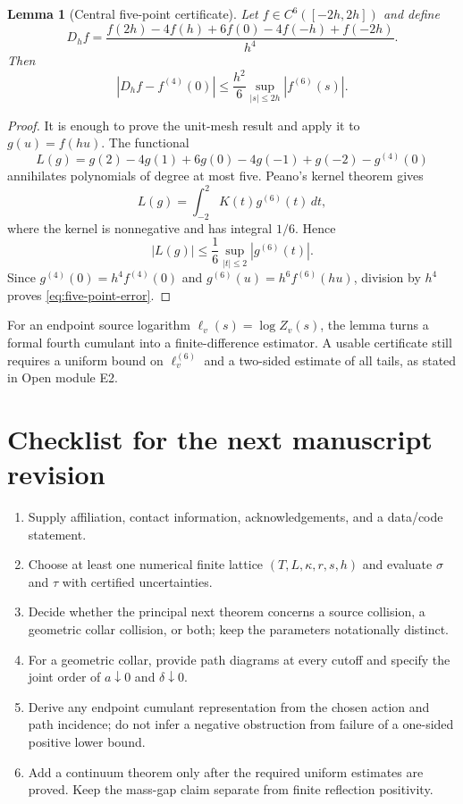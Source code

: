 \documentclass[11pt]{article}
\newtheorem{lemma}[theorem]{Lemma}
\begin{document}
\begin{lemma}[Central five-point certificate]
Let $f\in C^6([-2h,2h])$ and define
\begin{equation}
  D_hf
  =\frac{f(2h)-4f(h)+6f(0)-4f(-h)+f(-2h)}{h^4}.
  \label{eq:five-point}
\end{equation}
Then
\begin{equation}
  \left|D_hf-f^{(4)}(0)\right|
  \le\frac{h^2}{6}
  \sup_{|s|\le2h}|f^{(6)}(s)|.
  \label{eq:five-point-error}
\end{equation}
\end{lemma}

\begin{proof}
It is enough to prove the unit-mesh result and apply it to $g(u)=f(hu)$.  The functional
\[
  L(g)=g(2)-4g(1)+6g(0)-4g(-1)+g(-2)-g^{(4)}(0)
\]
annihilates polynomials of degree at most five.  Peano's kernel theorem gives
\[
  L(g)=\int_{-2}^{2}K(t)g^{(6)}(t)\,dt,
\]
where the kernel is nonnegative and has integral $1/6$.  Hence
\[
  |L(g)|\le\frac16\sup_{|t|\le2}|g^{(6)}(t)|.
\]
Since $g^{(4)}(0)=h^4f^{(4)}(0)$ and $g^{(6)}(u)=h^6f^{(6)}(hu)$, division by $h^4$ proves \eqref{eq:five-point-error}.
\end{proof}

For an endpoint source logarithm $\ell_v(s)=\log Z_v(s)$, the lemma turns a formal fourth cumulant into a finite-difference estimator.  A usable certificate still requires a uniform bound on $\ell_v^{(6)}$ and a two-sided estimate of all tails, as stated in Open module E2.

\section{Checklist for the next manuscript revision}
\label{app:checklist}

\begin{enumerate}[label=\textbf{P\arabic*.}]
  \item Supply affiliation, contact information, acknowledgements, and a data/code statement.
  \item Choose at least one numerical finite lattice $(T,L,\kappa,r,s,h)$ and evaluate $\sigma$ and $\tau$ with certified uncertainties.
  \item Decide whether the principal next theorem concerns a source collision, a geometric collar collision, or both; keep the parameters notationally distinct.
  \item For a geometric collar, provide path diagrams at every cutoff and specify the joint order of $a\downarrow0$ and $\delta\downarrow0$.
  \item Derive any endpoint cumulant representation from the chosen action and path incidence; do not infer a negative obstruction from failure of a one-sided positive lower bound.
  \item Add a continuum theorem only after the required uniform estimates are proved.  Keep the mass-gap claim separate from finite reflection positivity.
\end{enumerate}
\end{document}
